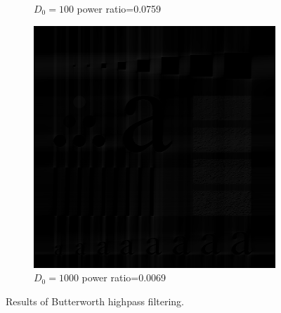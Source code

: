 \begin{figure}[h!]
\begin{subfigure}[b]{0.3\linewidth}
		\caption{$D_0=100$ power ratio=0.0759}
		\label{fig:BHPF_100}
	\end{subfigure}
	\begin{subfigure}[b]{0.3\linewidth}
		\includegraphics[width=\linewidth]{myfigure/p3/BHPF_1000.png}
		\caption{$D_0=1000$ power ratio=0.0069}
		\label{fig:BHPF_1000}
	\end{subfigure}
  	\caption{Results of Butterworth highpass filtering.}
  	\label{fig:BHPF}
\end{figure}

